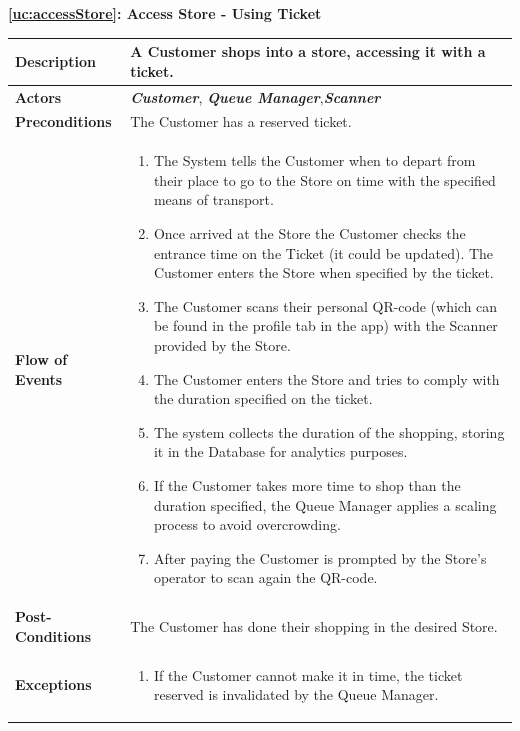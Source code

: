 \documentclass[a4paper, 12pt, oneside]{article}
\begin{document}
\begin{center}
{\textbf{\ref{uc:accessStore}: Access Store - Using Ticket}}
\end{center}
\begin{tabularx}{\linewidth}{| l | X |}
	
	\hline
	\textbf{Description} & A Customer shops into a store, accessing it with a ticket.\\
	

	\hline
	\textbf{Actors} & \textbf{\textit{Customer}}, \textit{\textbf{Queue Manager}},\textit{\textbf{Scanner}} \\
	
	\hline
	\textbf{Preconditions} & The Customer has a reserved ticket.\\
	
	\hline
	\textbf{Flow of Events} & \parbox{0.7\textwidth}{	
		\begin{enumerate}
			\item The System tells the Customer when to depart from their place to go to the Store on time with the specified means of transport.
			\item Once arrived at the Store the Customer checks the entrance time on the Ticket (it could be updated). The Customer enters the Store when specified by the ticket.
			\item The Customer scans their personal QR-code (which can be found in the profile tab in the app) with the Scanner provided by the Store.
			\item The Customer enters the Store and tries to comply with the duration specified on the ticket.
			\item The system collects the duration of the shopping, storing it in the Database for analytics purposes.
			\item If the Customer takes more time to shop than the duration specified, the Queue Manager applies a scaling process to avoid overcrowding.
			\item After paying the Customer is prompted by the Store's operator to scan again the QR-code.
	\end{enumerate}}\\
	
	\hline
	\textbf{Post-Conditions} & The Customer has done their shopping in the desired Store.\\
	
	\hline
	\textbf{Exceptions} & \parbox{0.7\textwidth}{ \begin{enumerate}
			\item If the Customer cannot make it in time, the ticket reserved is invalidated by the Queue Manager.
		\end{enumerate}}\\

	\hline
	
\end{tabularx}
\end{document}
